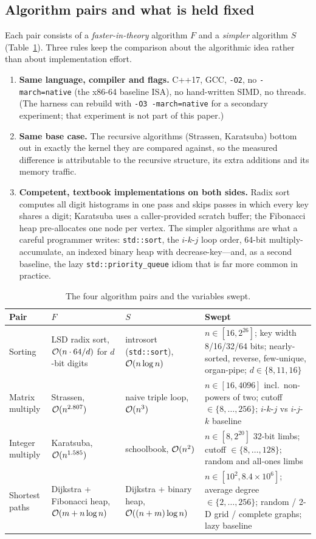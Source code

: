 \subsection{Algorithm pairs and what is held fixed}

Each pair consists of a \emph{faster-in-theory} algorithm $F$ and a
\emph{simpler} algorithm $S$ (Table~\ref{tab:pairs}). Three rules keep the
comparison about the algorithmic idea rather than about implementation effort.
\begin{enumerate}
  \item \textbf{Same language, compiler and flags.} C++17, GCC, \texttt{-O2},
  no \texttt{-march=native} (the x86-64 baseline ISA), no hand-written SIMD, no
  threads. (The harness can rebuild with \texttt{-O3 -march=native} for a
  secondary experiment; that experiment is not part of this paper.)
  \item \textbf{Same base case.} The recursive algorithms (Strassen, Karatsuba)
  bottom out in exactly the kernel they are compared against, so the measured
  difference is attributable to the recursive structure, its extra additions
  and its memory traffic.
  \item \textbf{Competent, textbook implementations on both sides.} Radix sort
  computes all digit histograms in one pass and skips passes in which every key
  shares a digit; Karatsuba uses a caller-provided scratch buffer; the
  Fibonacci heap pre-allocates one node per vertex. The simpler algorithms are
  what a careful programmer writes: \texttt{std::sort}, the $i$-$k$-$j$ loop
  order, 64-bit multiply-accumulate, an indexed binary heap with
  decrease-key---and, as a second baseline, the lazy \texttt{std::priority\_queue}
  idiom that is far more common in practice.
\end{enumerate}

\begin{table}[t]
\centering\small
\caption{The four algorithm pairs and the variables swept.}
\label{tab:pairs}
\begin{tabular}{p{2.2cm}p{3.3cm}p{3.3cm}p{5.6cm}}
\toprule
Pair & $F$ & $S$ & Swept \\
\midrule
Sorting & LSD radix sort, $\mathcal{O}(n\cdot 64/d)$ for $d$-bit digits & introsort (\texttt{std::sort}), $\mathcal{O}(n\log n)$ & $n\in[16,2^{26}]$; key width 8/16/32/64 bits; nearly-sorted, reverse, few-unique, organ-pipe; $d\in\{8,11,16\}$ \\
Matrix multiply & Strassen, $\mathcal{O}(n^{2.807})$ & naive triple loop, $\mathcal{O}(n^3)$ & $n\in[16,4096]$ incl.\ non-powers of two; cutoff $\in\{8,\dots,256\}$; $i$-$k$-$j$ vs $i$-$j$-$k$ baseline \\
Integer multiply & Karatsuba, $\mathcal{O}(n^{1.585})$ & schoolbook, $\mathcal{O}(n^2)$ & $n\in[8,2^{20}]$ 32-bit limbs; cutoff $\in\{8,\dots,128\}$; random and all-ones limbs \\
Shortest paths & Dijkstra + Fibonacci heap, $\mathcal{O}(m+n\log n)$ & Dijkstra + binary heap, $\mathcal{O}((n+m)\log n)$ & $n\in[10^2,8.4\times10^6]$; average degree $\in\{2,\dots,256\}$; random / 2-D grid / complete graphs; lazy baseline \\
\bottomrule
\end{tabular}
\end{table}

